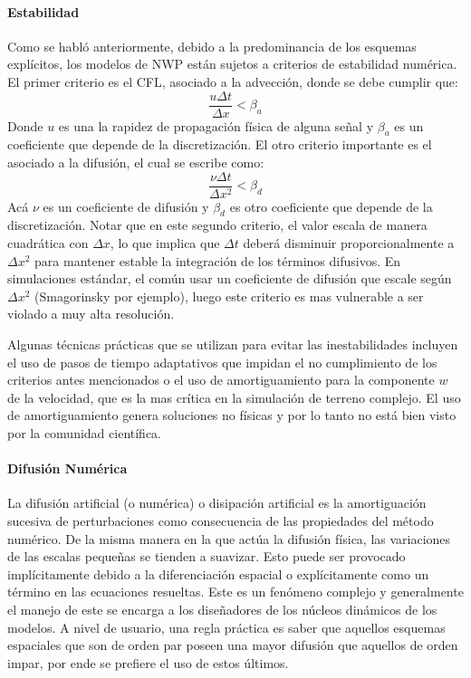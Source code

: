 \paragraph{Estabilidad} Como se habló anteriormente, debido a la predominancia de los esquemas explícitos, los modelos de NWP están sujetos a criterios de estabilidad numérica. El primer criterio es el CFL, asociado a la advección, donde se debe cumplir que:
\begin{equation}\label{eq:cfl}
\frac{u\Delta t}{\Delta x}<\beta_a
\end{equation}
Donde $u$ es una la rapidez de propagación física de alguna señal y $\beta_a$ es un coeficiente que depende de la discretización. El otro criterio importante es el asociado a la difusión, el cual se escribe como:
\begin{equation}\label{eq:cfl_d}
\frac{\nu\Delta t}{\Delta x^2}<\beta_d
\end{equation}
Acá $\nu$ es un coeficiente de difusión y $\beta_d$ es otro coeficiente que depende de la discretización. Notar que en este segundo criterio, el valor escala de manera cuadrática con $\Delta x$, lo que implica que $\Delta t$ deberá disminuir proporcionalmente a $\Delta x^2$ para mantener estable la integración de los términos difusivos. En simulaciones estándar, el común usar un coeficiente de difusión que escale según $\Delta x^2$ (Smagorinsky por ejemplo), luego este criterio es mas vulnerable a ser violado a muy alta resolución.

Algunas técnicas prácticas que se utilizan para evitar las inestabilidades incluyen el uso de pasos de tiempo adaptativos que impidan el no cumplimiento de los criterios antes mencionados o el uso de amortiguamiento para la componente $w$ de la velocidad, que es la mas crítica en la simulación de terreno complejo. El uso de amortiguamiento genera soluciones no físicas y por lo tanto no está bien visto por la comunidad científica.

\paragraph{Difusión Numérica} La difusión artificial (o numérica) o disipación artificial es la amortiguación sucesiva de perturbaciones como consecuencia de las propiedades del método numérico. De la misma manera en la que actúa la difusión física, las variaciones de las escalas pequeñas se tienden a suavizar. Esto puede ser provocado implícitamente debido a la diferenciación espacial o explícitamente como un término en las ecuaciones resueltas. Este es un fenómeno complejo y generalmente el manejo de este se encarga a los diseñadores de los núcleos dinámicos de los modelos. A nivel de usuario, una regla práctica es saber que aquellos esquemas espaciales que son de orden par poseen una mayor difusión que aquellos de orden impar, por ende se prefiere el uso de estos últimos.

